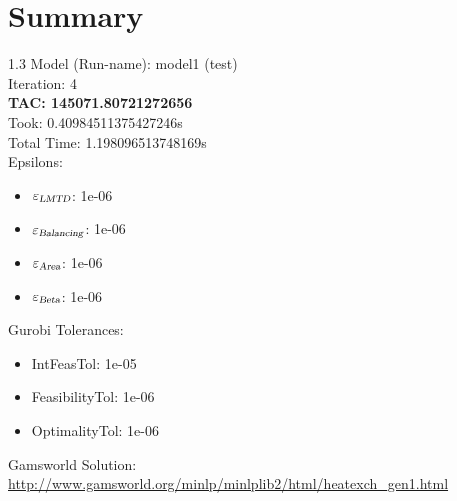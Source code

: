\documentclass{article}%
\begin{document}
%
\normalsize%
\section{Summary}%
\thispagestyle{plain}%
\begin{spacing}{1.3}%
\Large%
Model (Run-name): model1 (test)\\%
Iteration: 4\\%
\textbf{TAC: 145071.80721272656}\\%
Took: 0.40984511375427246s\\%
Total Time: 1.198096513748169s\\%
Epsilons:%
\begin{itemize}%
	\item $\varepsilon_{\textsl{LMTD}}$: 1e-06%
	\item $\varepsilon_{\textsl{Balancing}}$: 1e-06%
	\item $\varepsilon_{\textsl{Area}}$: 1e-06%
	\item $\varepsilon_{\textsl{Beta}}$: 1e-06%
\end{itemize}%
Gurobi Tolerances:%
\begin{itemize}%
	\item IntFeasTol: 1e-05%
	\item FeasibilityTol: 1e-06%
	\item OptimalityTol: 1e-06%
\end{itemize}%
\end{spacing}%
\normalsize%
Gamsworld Solution: \url{http://www.gamsworld.org/minlp/minlplib2/html/heatexch_gen1.html}%
%
\clearpage%
\end{document}
